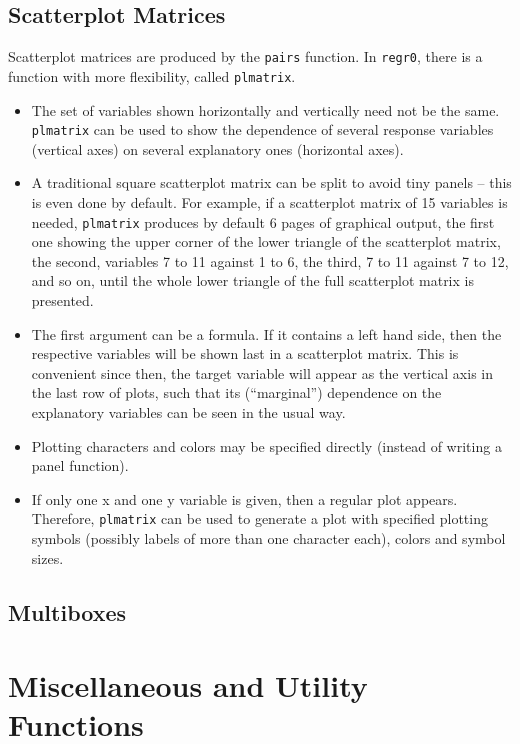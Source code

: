 \documentclass{article}
\providecommand{\T}{\texttt}
\providecommand{\Vneed}[1]{\penalty-5000\vskip#1%
\penalty-5000\vspace{-#1}}
\begin{document}
\subsection{Scatterplot Matrices}
Scatterplot matrices are produced by the \T{pairs} function.
In \T{regr0}, there is a function with more flexibility, called
\T{plmatrix}.
\begin{itemize}
\item 
  The set of variables shown horizontally and vertically need not be the
  same. \T{plmatrix} can be used to show the dependence of several 
  response variables (vertical axes) on several explanatory ones
  (horizontal axes).
\item
  A traditional square scatterplot matrix can be split to avoid
  tiny panels -- this is even done by default. For example, if 
  a scatterplot matrix of 15 variables is needed, 
  \T{plmatrix} produces by default 6 pages of graphical output,
  the first one showing the %
  upper corner of the lower triangle of the scatterplot matrix,
  the second, variables 7 to 11 against 1 to 6, the third, 
  7 to 11 against 7 to 12, and so on, until the whole lower triangle
  of the full scatterplot matrix is presented.
\item
  The first argument can be a formula. If it contains a left hand side,
  then the respective variables will be shown last in a scatterplot
  matrix. This is convenient since then, the target variable will appear as
  the vertical axis in the last row of plots, such that its (``marginal'')
  dependence on the explanatory variables can be seen in the usual way.
\item
  Plotting characters and colors may be specified directly (instead of 
  writing a panel function).
\item
  If only one x and one y variable is given, then a regular plot appears.
  Therefore, \T{plmatrix} can be used to generate a plot with specified
  plotting symbols (possibly labels of more than one character each),
  colors and symbol sizes.
\end{itemize}

\subsection{Multiboxes}

\Vneed{50mm}
\section{Miscellaneous and Utility Functions}
\end{document}
